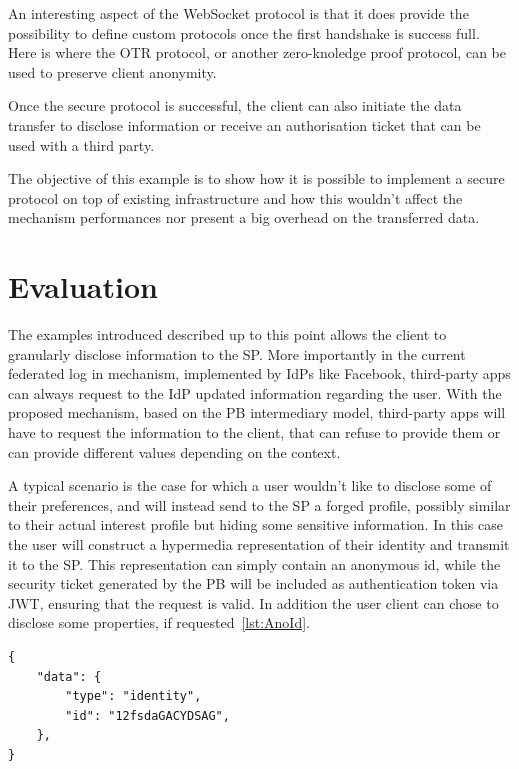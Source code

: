 An interesting aspect of the WebSocket protocol is that it does provide the possibility to define custom protocols once the first handshake is success full. Here is where the OTR protocol, or another zero-knoledge proof protocol, can be used to preserve client anonymity. 

Once the secure protocol is successful, the client can also initiate the data transfer to disclose information or receive an authorisation ticket that can be used with a third party.

The objective of this example is to show how it is possible to implement a secure protocol on top of existing infrastructure and how this wouldn't affect the mechanism performances nor present a big overhead on the transferred data.

\section{Evaluation}

The examples introduced described up to this point allows the client to granularly disclose information to the SP. More importantly in the current federated log in mechanism, implemented by IdPs like Facebook, third-party apps can always request to the IdP updated information regarding the user. With the proposed mechanism, based on the PB intermediary model, third-party apps will have to request the information to the client, that can refuse to provide them or can provide different values depending on the context. 

A typical scenario is the case for which a user wouldn't like to disclose some of their preferences, and will instead send to the SP a forged profile, possibly similar to their actual interest profile but hiding some sensitive information. In this case the user will construct a hypermedia representation of their identity and transmit it to the SP. This representation can simply contain an anonymous id, while the security ticket generated by the PB will be included as authentication token via JWT, ensuring that the request is valid. In addition the user client can chose to disclose some properties, if requested~\ref{lst:AnoId}.

\begin{lstlisting}
{
    "data": {
        "type": "identity",
        "id": "12fsdaGACYDSAG",
    },
}
\end{lstlisting}

